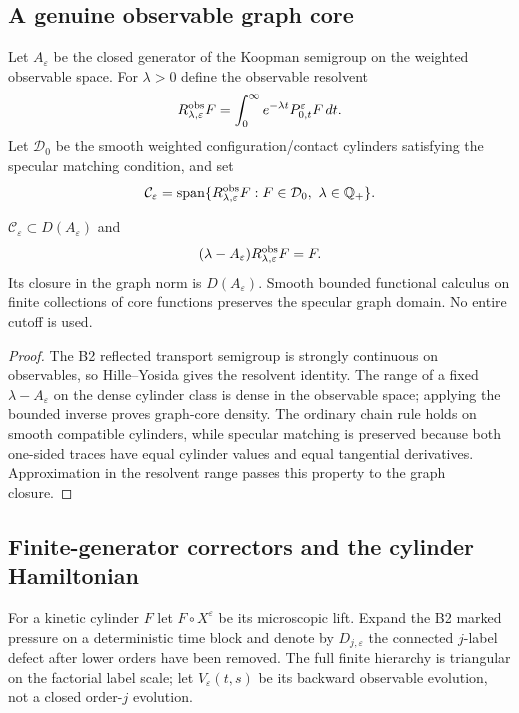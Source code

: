 \subsection{A genuine observable graph core}

Let $A_\varepsilon$ be the closed generator of the Koopman semigroup on the
weighted observable space.  For $\lambda>0$ define the observable resolvent
\[
 R_{\lambda,\varepsilon}^{\rm obs}F
 =\int_0^\infty e^{-\lambda t}P_{0,t}^\varepsilon F\,dt.
\]
Let $\mathcal D_0$ be the smooth weighted configuration/contact cylinders
satisfying the specular matching condition, and set
\[
 \mathcal C_\varepsilon
 =\operatorname{span}\{R_{\lambda,\varepsilon}^{\rm obs}F:
  F\in\mathcal D_0,\ \lambda\in\mathbb Q_+\}.
\]

\begin{theorem}
\label{thm:r10-b4-core}
$\mathcal C_\varepsilon\subset D(A_\varepsilon)$ and
\[
 (\lambda-A_\varepsilon)
 R_{\lambda,\varepsilon}^{\rm obs}F=F.
\]
Its closure in the graph norm is $D(A_\varepsilon)$.  Smooth bounded
functional calculus on finite collections of core functions preserves the
specular graph domain.  No entire cutoff is used.
\end{theorem}

\begin{proof}
The B2 reflected transport semigroup is strongly continuous on observables,
so Hille--Yosida gives the resolvent identity.  The range of a fixed
$\lambda-A_\varepsilon$ on the dense cylinder class is dense in the
observable space; applying the bounded inverse proves graph-core density.
The ordinary chain rule holds on smooth compatible cylinders, while specular
matching is preserved because both one-sided traces have equal cylinder
values and equal tangential derivatives.  Approximation in the resolvent
range passes this property to the graph closure.
\end{proof}

\subsection{Finite-generator correctors and the cylinder Hamiltonian}

For a kinetic cylinder $F$ let $F\circ X^\varepsilon$ be its microscopic
lift.  Expand the B2 marked pressure on a deterministic time block and denote
by $D_{j,\varepsilon}$ the connected $j$-label defect after lower orders have
been removed.  The full finite hierarchy is triangular on the factorial
label scale; let $V_\varepsilon(t,s)$ be its backward observable evolution,
not a closed order-$j$ evolution.

